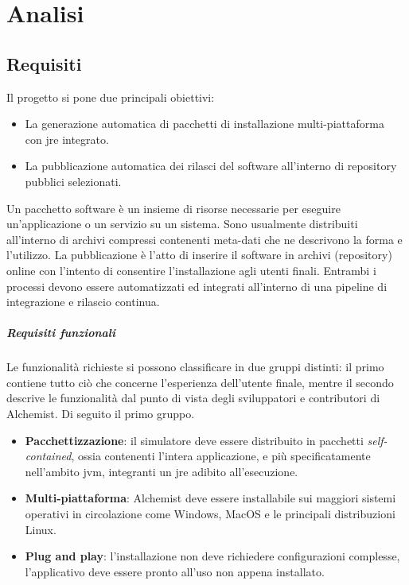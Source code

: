 
\chapter{Analisi}

\section{Requisiti}

Il progetto si pone due principali obiettivi:
\begin{itemize}
	\item La generazione automatica di pacchetti di installazione multi-piattaforma \\ con \ac{jre} integrato.
	\item La pubblicazione automatica dei rilasci del software all'interno di repository pubblici selezionati.
\end{itemize}
Un pacchetto software è un insieme di risorse necessarie per eseguire un'applicazione o un servizio su un sistema. Sono usualmente distribuiti all'interno di archivi compressi contenenti meta-dati che ne descrivono la forma e l'utilizzo. La pubblicazione è l'atto di inserire il software in archivi (repository) online con l'intento di consentire l'installazione agli utenti finali. Entrambi i processi devono essere automatizzati ed integrati all'interno di una pipeline di integrazione e rilascio continua.

\paragraph{Requisiti funzionali}

Le funzionalità richieste si possono classificare in due gruppi distinti: il primo contiene tutto ciò che concerne l'esperienza dell'utente finale, mentre il secondo descrive le funzionalità dal punto di vista degli sviluppatori e contributori di Alchemist. Di seguito il primo gruppo.
\begin{itemize}
	\item \textbf{Pacchettizzazione}: il simulatore deve essere distribuito in pacchetti \textit{self-contained}, ossia contenenti l'intera applicazione, e più specificatamente nell'ambito \ac{jvm}, integranti un \ac{jre} adibito all'esecuzione.
	\item \textbf{Multi-piattaforma}: Alchemist deve essere installabile sui maggiori sistemi operativi in circolazione come Windows, MacOS e le principali distribuzioni Linux.
	\item \textbf{Plug and play}: l'installazione non deve richiedere configurazioni complesse, l'applicativo deve essere pronto all'uso non appena installato.
\end{itemize}

